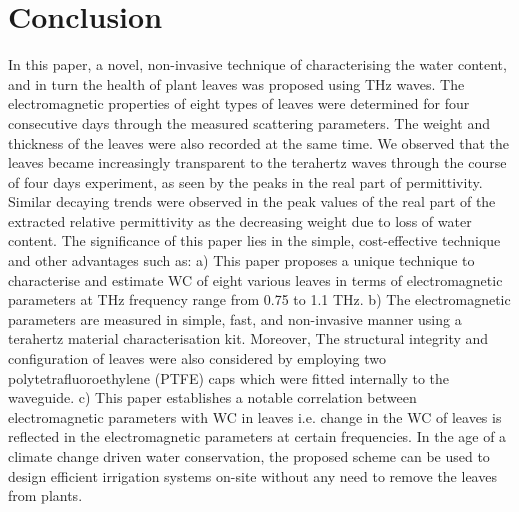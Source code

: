 \documentclass[preprints,article,accept,moreauthors,pdftex]{Definitions/mdpi}
\renewcommand{\^}{\hat}  %
\begin{document}
\section{Conclusion}
\label{sec:conclusion}
%

In this paper, a novel, non-invasive technique of characterising the water content, and in turn the health of plant leaves was proposed using THz waves. The electromagnetic properties of eight types of leaves were determined for four consecutive days through the measured scattering parameters. The weight and thickness of the leaves were also recorded at the same time. We observed that the leaves became increasingly transparent to the terahertz waves through the course of four days experiment, {as seen by the peaks in the real part of permittivity}. Similar decaying trends were observed in the peak values of the real part of the extracted relative permittivity as the decreasing weight due to loss of water content. {The significance of this paper lies in the simple, cost-effective technique and other advantages such as: a) This paper proposes a unique technique to characterise and estimate WC of eight various leaves in terms of electromagnetic parameters at THz frequency range from 0.75 to 1.1 THz.
b) The electromagnetic parameters are measured in simple, fast, and non-invasive manner using a terahertz material characterisation kit. Moreover, The structural integrity and configuration of leaves were also considered by employing two polytetrafluoroethylene (PTFE) caps which were fitted internally to the waveguide.
c) This paper establishes a notable correlation between electromagnetic parameters with WC in leaves i.e. change in the WC of leaves is reflected in the electromagnetic parameters at certain frequencies.} In the age of a climate change driven water conservation, the proposed scheme can be used to design efficient irrigation systems on-site without any need to remove the leaves from plants. 
\end{document}

